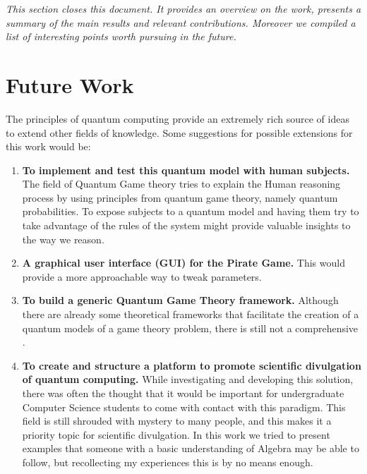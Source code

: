 \label{cap:conclusions}

\textit{This section closes this document. It provides an overview on the work, presents a summary of the main results and relevant contributions. Moreover we compiled a list of interesting points worth pursuing in the future.}


\section{Future Work}
\label{sec:5FutureWork}

The principles of quantum computing provide an extremely rich source of ideas to extend other fields of knowledge.
Some suggestions for possible extensions for this work would be:

\begin{enumerate}
\item \textbf{To implement and test this quantum model with human subjects.} The field of Quantum Game theory tries to explain the Human reasoning process by using principles from quantum game theory, namely quantum probabilities. To expose subjects to a quantum model and having them try to take advantage of the rules of the system might provide valuable insights to the way we reason. 
\item \textbf{A graphical user interface (GUI) for the Pirate Game.} This would provide a more approachable way to tweak parameters.
\item \textbf{To build a generic Quantum Game Theory framework.} Although there are already some theoretical frameworks that facilitate the creation of a quantum models of a game theory problem, there is still not a comprehensive .
\item \textbf{To create and structure a platform to promote scientific divulgation of quantum computing.} While investigating and developing this solution, there was often the thought that it would be important for undergraduate Computer Science students to come with contact with this paradigm. This field is still shrouded with mystery to many people, and this makes it a priority topic for scientific divulgation. In this work we tried to present examples that someone with a basic understanding of Algebra may be able to follow, but recollecting my experiences this is by no means enough.
\end{enumerate}

\cleardoublepage